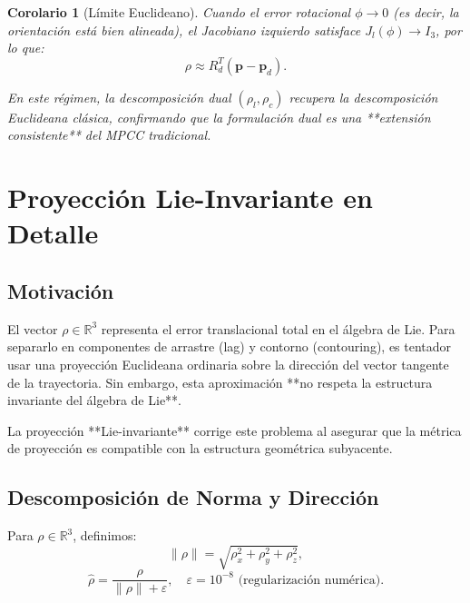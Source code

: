 \documentclass[11pt,a4paper]{article}
\newtheorem{corollary}[theorem]{Corolario}
\begin{document}
\begin{corollary}[Límite Euclideano]
Cuando el error rotacional $\phi \to 0$ (es decir, la orientación está bien alineada), el Jacobiano izquierdo satisface $J_l(\phi) \to I_3$, por lo que:
\begin{equation}
    \rho \approx R_d^T (\mathbf{p} - \mathbf{p}_d).
\end{equation}

En este régimen, la descomposición dual $(\rho_l, \rho_c)$ recupera la descomposición Euclideana clásica, confirmando que la formulación dual es una **extensión consistente** del MPCC tradicional.
\end{corollary}

\section{Proyección Lie-Invariante en Detalle}
\label{sec:lie_projection}

\subsection{Motivación}

El vector $\rho \in \mathbb{R}^3$ representa el error translacional total en el álgebra de Lie. Para separarlo en componentes de arrastre (lag) y contorno (contouring), es tentador usar una proyección Euclideana ordinaria sobre la dirección del vector tangente de la trayectoria. Sin embargo, esta aproximación **no respeta la estructura invariante del álgebra de Lie**. 

La proyección **Lie-invariante** corrige este problema al asegurar que la métrica de proyección es compatible con la estructura geométrica subyacente.

\subsection{Descomposición de Norma y Dirección}

Para $\rho \in \mathbb{R}^3$, definimos:
\begin{equation}
    \|\rho\| = \sqrt{\rho_x^2 + \rho_y^2 + \rho_z^2},
\end{equation}
\begin{equation}
    \hat{\rho} = \frac{\rho}{\|\rho\| + \varepsilon}, \quad \varepsilon = 10^{-8} \text{ (regularización numérica)}.
\end{equation}
\end{document}
